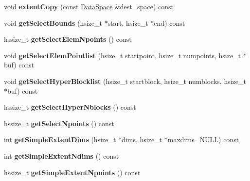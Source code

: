 \begin{DoxyCompactItemize}
void {\bfseries extent\+Copy} (const \hyperlink{class_h5_1_1_data_space}{Data\+Space} \&dest\+\_\+space) const
\item 
\mbox{\label{class_h5_1_1_data_space_a6ed1e810bcaa5cc0cb1cd5b5e680608c}} 
void {\bfseries get\+Select\+Bounds} (hsize\+\_\+t $\ast$start, hsize\+\_\+t $\ast$end) const
\item 
\mbox{\label{class_h5_1_1_data_space_adf9fc83bb5ddb02012b01a387fe54361}} 
hssize\+\_\+t {\bfseries get\+Select\+Elem\+Npoints} () const
\item 
\mbox{\label{class_h5_1_1_data_space_af77de3b28ddc261a3e906519e87a9f2a}} 
void {\bfseries get\+Select\+Elem\+Pointlist} (hsize\+\_\+t startpoint, hsize\+\_\+t numpoints, hsize\+\_\+t $\ast$buf) const
\item 
\mbox{\label{class_h5_1_1_data_space_ad113c8fff065e490347f509f1c2bd9ac}} 
void {\bfseries get\+Select\+Hyper\+Blocklist} (hsize\+\_\+t startblock, hsize\+\_\+t numblocks, hsize\+\_\+t $\ast$buf) const
\item 
\mbox{\label{class_h5_1_1_data_space_a3132ad36aab6dd71b2005a125a51e320}} 
hssize\+\_\+t {\bfseries get\+Select\+Hyper\+Nblocks} () const
\item 
\mbox{\label{class_h5_1_1_data_space_af9c47e6c67444d332acd6955375df5b1}} 
hssize\+\_\+t {\bfseries get\+Select\+Npoints} () const
\item 
\mbox{\label{class_h5_1_1_data_space_a94422ac0835aa150c38f6dd1433996ef}} 
int {\bfseries get\+Simple\+Extent\+Dims} (hsize\+\_\+t $\ast$dims, hsize\+\_\+t $\ast$maxdims=N\+U\+LL) const
\item 
\mbox{\label{class_h5_1_1_data_space_af3d8db42fd70451898c5928d02e124a5}} 
int {\bfseries get\+Simple\+Extent\+Ndims} () const
\item 
\mbox{\label{class_h5_1_1_data_space_a1e3022199d797713c55614ccad1edaf5}} 
hssize\+\_\+t {\bfseries get\+Simple\+Extent\+Npoints} () const
\item 

\end{DoxyCompactItemize}

